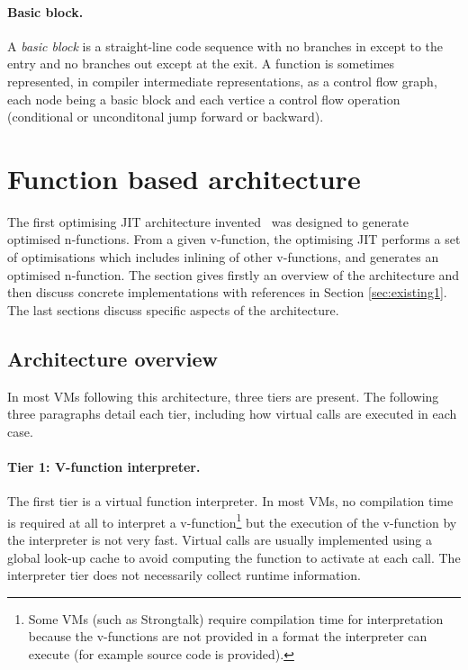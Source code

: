 \documentclass[a4paper,12pt,twoside]{../includes/ThesisStyle}
\begin{document}

\paragraph{Basic block.} A \emph{basic block} is a straight-line code sequence with no branches in except to the entry and no branches out except at the exit. A function is sometimes represented, in compiler intermediate representations, as a control flow graph, each node being a basic block and each vertice a control flow operation (conditional or unconditonal jump forward or backward).


\section{Function based architecture}
\label{sec:architecture}

The first optimising JIT architecture invented~\cite{UrsPHD} was designed to generate optimised n-functions. From a given v-function, the optimising JIT performs a set of optimisations which includes inlining of other v-functions, and generates an optimised n-function. The section gives firstly an overview of the architecture and then discuss concrete implementations with references in Section \ref{sec:existing1}. The last sections discuss specific aspects of the architecture.

\subsection{Architecture overview}

In most VMs following this architecture, three tiers are present. The following three paragraphs detail each tier, including how virtual calls are executed in each case.

\paragraph{Tier 1: V-function interpreter. } The first tier is a virtual function interpreter. In most VMs, no compilation time is required at all to interpret a v-function\footnote{Some VMs (such as Strongtalk) require compilation time for interpretation because the v-functions are not provided in a format the interpreter can execute (for example source code is provided).} but the execution of the v-function by the interpreter is not very fast. Virtual calls are usually implemented using a global look-up cache to avoid computing the function to activate at each call. The interpreter tier does not necessarily collect runtime information. 
\end{document}
